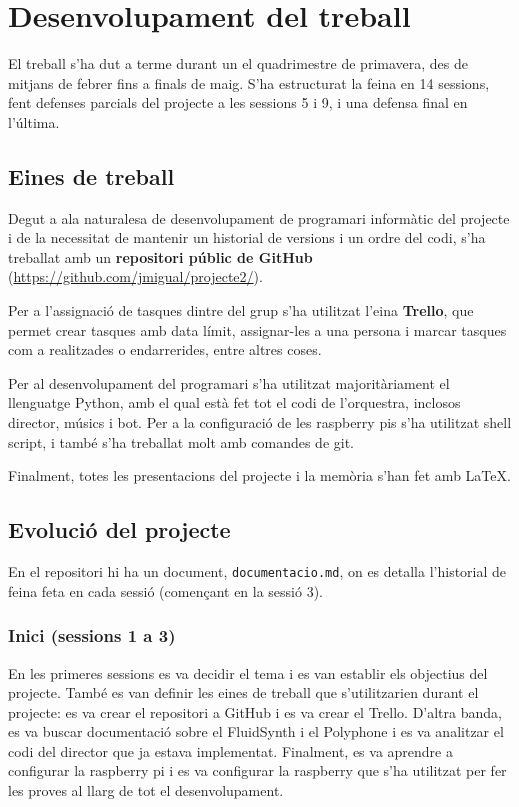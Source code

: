 \documentclass[a4paper]{article}
\begin{document}
\section{Desenvolupament del treball}
El treball s'ha dut a terme durant un el quadrimestre de primavera, des de mitjans de febrer fins a finals de maig. S'ha estructurat la feina en 14 sessions, fent defenses parcials del projecte a les sessions 5 i 9, i una defensa final en l'última.

\subsection{Eines de treball}
Degut a ala naturalesa de desenvolupament de programari informàtic del projecte i de la necessitat de mantenir un historial de versions i un ordre del codi, s'ha treballat amb un \textbf{repositori públic de GitHub} (\url{https://github.com/jmigual/projecte2/}).

Per a l'assignació de tasques dintre del grup s'ha utilitzat l'eina \textbf{Trello}, que permet crear tasques amb data límit, assignar-les a una persona i marcar tasques com a realitzades o endarrerides, entre altres coses.

Per al desenvolupament del programari s'ha utilitzat majoritàriament el llenguatge Python, amb el qual està fet tot el codi de l'orquestra, inclosos director, músics i bot. Per a la configuració de les raspberry pis s'ha utilitzat shell script, i també s'ha treballat molt amb comandes de git.

Finalment, totes les presentacions del projecte i la memòria s'han fet amb \LaTeX.

\subsection{Evolució del projecte}
En el repositori hi ha un document, \texttt{documentacio.md}, on es detalla l'historial de feina feta en cada sessió (començant en la sessió 3).

\subsubsection{Inici (sessions 1 a 3)}
En les primeres sessions es va decidir el tema i es van establir els objectius del projecte. També es van definir les eines de treball que s'utilitzarien durant el projecte: es va crear el repositori a GitHub i es va crear el Trello. D'altra banda, es va buscar documentació sobre el FluidSynth i el Polyphone i es va analitzar el codi del director que ja estava implementat. Finalment, es va aprendre a configurar la raspberry pi i es va configurar la raspberry que s'ha utilitzat per fer les proves al llarg de tot el desenvolupament.
\end{document}
